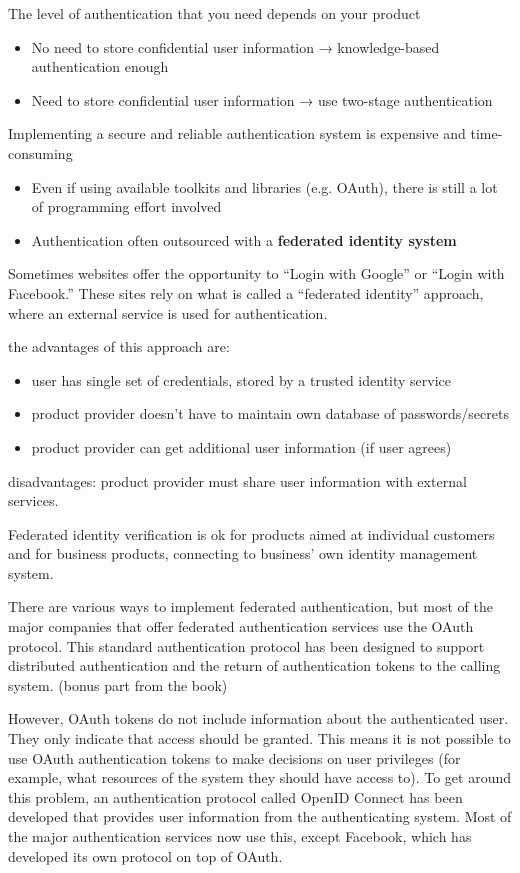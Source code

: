 The level of authentication that you need depends on your product
\begin{itemize}
   \item No need to store confidential user information → knowledge-based authentication enough
   \item Need to store confidential user information → use two-stage authentication
\end{itemize}

Implementing a secure and reliable authentication system is expensive and time-consuming
\begin{itemize}
   \item Even if using available toolkits and libraries (e.g. OAuth), there is still a lot of programming effort involved
   \item Authentication often outsourced with a \textbf{federated identity system}
\end{itemize}
Sometimes websites offer the opportunity to “Login with Google” or “Login with Facebook.” These sites rely on what is called a “federated identity” approach, where an external service is used for authentication.

the advantages of this approach are:
\begin{itemize}
   \item user has single set of credentials, stored by a trusted identity service
   \item product provider doesn’t have to maintain own database of passwords/secrets
   \item product provider can get additional user information (if user agrees)
\end{itemize}
disadvantages: product provider must share user information with external services.

Federated identity verification is ok for products aimed at individual customers and for business products, connecting to business' own identity management system.

There are various ways to implement federated authentication, but most of the major companies that offer federated authentication services use the OAuth protocol. This standard authentication protocol has been designed to support distributed authentication and the return of authentication tokens to the calling system.
(bonus part from the book)

However, OAuth tokens do not include information about the authenticated user. They only indicate that access should be granted. This means it is not possible to use OAuth authentication tokens to make decisions on user privileges (for example, what resources of the system they should have access to). To get around this problem, an authentication protocol called OpenID Connect has been developed that provides user information from the authenticating system. Most of the major authentication services now use this, except Facebook, which has developed its own protocol on top of OAuth.

